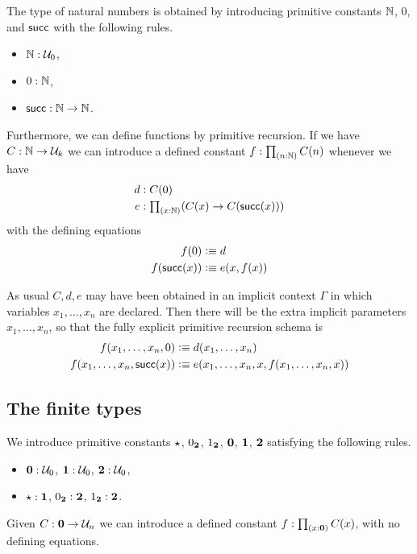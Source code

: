 The type of natural numbers is obtained by introducing primitive constants
$\mathbb{N}$, $0$, and $\mathsf{succ}$ with the following rules.
\begin{itemize}
  \item $\mathbb{N} : \mathcal{U}_0$,
  \item $0:\mathbb{N}$,
  \item $\mathsf{succ}:\mathbb{N}\rightarrow \mathbb{N}$.
\end{itemize}

Furthermore, we can define functions by primitive recursion.  If we have
$C : \mathbb{N} \rightarrow \mathcal{U}_k $ we can introduce a defined constant $f:\tprd{n:\N}C(n)$ whenever we have
  \begin{align*}
    d & : C(0) \\
    e & : \tprd{x:\N}(C(x)\rightarrow C(\suc (x)))
  \end{align*}
with the defining equations
  \begin{align*}
    f(0) & \vcentcolon\equiv d \\
    f(\mathsf{succ} (x)) & \vcentcolon\equiv e(x,f(x))
  \end{align*}
 
As usual $C,d,e$ may have been obtained in an implicit context $\Gamma$ in which variables $x_1,\ldots,x_n$ are declared.  Then there will be the extra implicit parameters $x_1,\ldots,x_n$, so that the fully explicit primitive recursion schema is
  \begin{align*}
    f(x_1,\dots,x_n,0) & \vcentcolon\equiv d(x_1,\dots,x_n) \\
    f(x_1,\dots,x_n,\mathsf{succ} (x)) & \vcentcolon\equiv e(x_1,\dots,x_n,x,f(x_1,\dots,x_n,x))
  \end{align*}

\subsection{The finite types}

We introduce primitive constants $\star$, ${0_{\mathbf{2}}}$, ${1_{\mathbf{2}}}$, $\mathbf{0}$,
$\mathbf{1}$, $\mathbf{2}$ satisfying the following rules.

\begin{itemize}
\item $\mathbf{0} : \mathcal{U}_0$, $\mathbf{1} : \mathcal{U}_0$, $\mathbf{2} : \mathcal{U}_0$,
\item $\star:\mathbf{1}$, ${0_{\mathbf{2}}}:\mathbf{2}$, ${1_{\mathbf{2}}}:\mathbf{2}$.
\end{itemize}

Given $C : \mathbf{0} \rightarrow \mathcal{U}_n$ we can introduce a defined constant $f:\tprd{x:\emptyt} C(x)$, with no defining equations.

